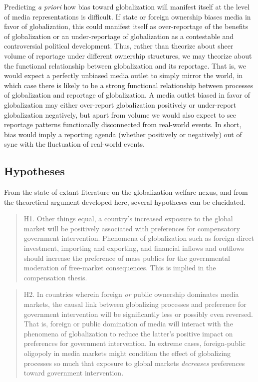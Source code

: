 \documentclass[12pt]{report}
\begin{document}
Predicting \emph{a priori} how bias toward globalization will manifest itself at the level of media
representations is difficult. If state or foreign ownership biases media in favor of globalization,
this could manifest itself as over-reportage of the benefits of globalization or an under-reportage
of globalization as a contestable and controversial political development. Thus, rather than
theorize about sheer volume of reportage under different ownership structures, we may theorize about
the functional relationship between globalization and its reportage. That is, we would expect a
perfectly unbiased media outlet to simply mirror the world, in which case there is likely to be a
strong functional relationship between processes of globalization and reportage of globalization. A
media outlet biased in favor of globalization may either over-report globalization positively or
under-report globalization negatively, but apart from volume we would also expect to see reportage
patterns functionally disconnected from real-world events. In short, bias would imply a reporting
agenda (whether positively or negatively) out of sync with the fluctuation of real-world events.

\subsection{Hypotheses}

From the state of extant literature on the globalization-welfare nexus, and
from the theoretical argument developed here, several hypotheses can be elucidated.

\singlespacing \begin{quote} H1. Other things equal, a country's increased exposure to the global
market will be positively associated with preferences for compensatory government intervention.
Phenomena of globalization such as foreign direct investment, importing and exporting, and financial
inflows and outflows should increase the preference of mass publics for the governmental moderation
of free-market consequences. This is implied in the compensation thesis. \end{quote} \doublespacing

\singlespacing \begin{quote} H2. In countries wherein foreign \emph{or} public ownership dominates
media markets, the causal link between globalizing processes and preference for government
intervention will be significantly less or possibly even reversed. That is, foreign or public
domination of media will interact with the phenomena of globalization to reduce the latter's
positive impact on preferences for government intervention. In extreme cases, foreign-public
oligopoly in media markets might condition the effect of globalizing processes so much that exposure
to global markets \emph{decreases} preferences toward government intervention. \end{quote}
\doublespacing
\end{document}
